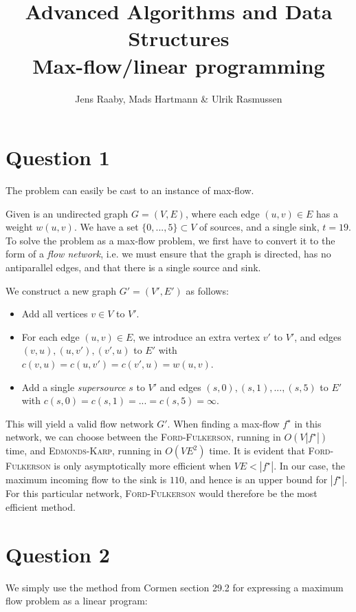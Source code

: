 \documentclass[a4paper, 10pt, oneside, article]{memoir}
\title{Advanced Algorithms and Data Structures\\Max-flow/linear programming}
\author{Jens Raaby, Mads Hartmann \& Ulrik Rasmussen}
\begin{document}
\maketitle

\section*{Question 1}

The problem can easily be cast to an instance of max-flow.

Given is an undirected graph $G = (V, E)$, where each edge $(u,v) \in
E$ has a weight $w(u,v)$. We have a set $\{0, ..., 5\} \subset V$ of
sources, and a single sink, $t=19$. To solve the problem as a max-flow
problem, we first have to convert it to the form of a \emph{flow
  network}, i.e. we must ensure that the graph is directed, has no
antiparallel edges, and that there is a single source and sink.

We construct a new graph $G' = (V', E')$ as follows:

\begin{itemize}
\item Add all vertices $v \in V$ to $V'$.
\item For each edge $(u,v) \in E$, we introduce an extra vertex $v'$
  to $V'$, and edges $(v,u), (u,v'), (v', u)$ to $E'$ with $c(v,u) =
  c(u,v') = c(v', u) = w(u,v)$.
\item Add a single \emph{supersource} $s$ to $V'$ and edges $(s,0),
  (s,1), ..., (s,5)$ to $E'$ with $c(s,0) = c(s, 1) = ... = c(s,5) =
  \infty$.
\end{itemize}

This will yield a valid flow network $G'$. When finding a max-flow
$f^\star$ in this network, we can choose between the
\textsc{Ford-Fulkerson}, running in $O(V |f^\star|)$ time, and
\textsc{Edmonds-Karp}, running in $O(VE^2)$ time. It is evident that
\textsc{Ford-Fulkerson} is only asymptotically more efficient when $VE
< |f^\star|$. In our case, the maximum incoming flow to the sink is
$110$, and hence is an upper bound for $|f^\star|$. For this
particular network, \textsc{Ford-Fulkerson} would therefore be the
most efficient method.


\section*{Question 2}

We simply use the method from Cormen section 29.2 for expressing a
maximum flow problem as a linear program:
\end{document}

